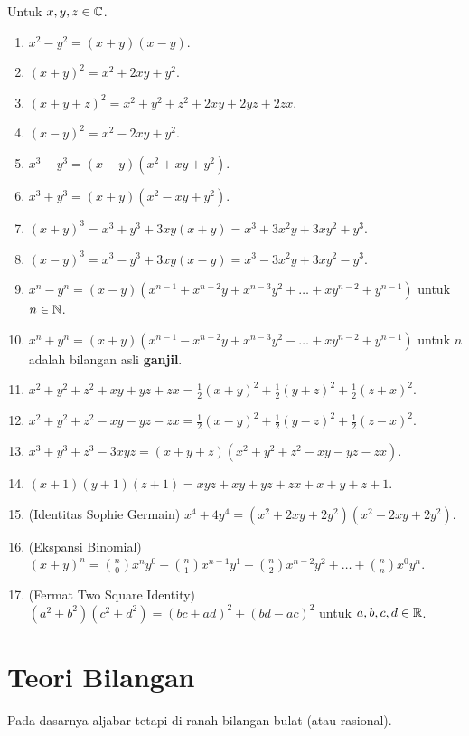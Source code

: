\documentclass[11pt]{scrartcl}
\begin{document}
	Untuk $x,y,z \in \mathbb C$.
	\begin{enumerate}
	    \item $x^2-y^2 = (x+y)(x-y)$.
	    \item $(x+y)^2 = x^2+2xy+y^2$.
	    \item $(x+y+z)^2 = x^2+y^2+z^2+2xy+2yz+2zx$.
	    \item $(x-y)^2 = x^2-2xy+y^2$.
	    \item $x^3-y^3 = (x-y)(x^2+xy+y^2)$.
	    \item $x^3+y^3 = (x+y)(x^2-xy+y^2)$.
	    \item $(x+y)^3 = x^3+y^3+3xy(x+y) = x^3+3x^2y+3xy^2+y^3$. 
	    \item $(x-y)^3 = x^3-y^3+3xy(x-y) = x^3-3x^2y+3xy^2-y^3$. 
	    \item $x^n-y^n = (x-y)(x^{n-1}+x^{n-2}y+x^{n-3}y^2+\dots+xy^{n-2}+y^{n-1})$ untuk $n \in \mathbb N$.
	    \item $x^n+y^n = (x+y)(x^{n-1}-x^{n-2}y+x^{n-3}y^2-\dots+xy^{n-2}+y^{n-1})$ untuk $n$ adalah bilangan asli \textbf{ganjil}.
	    \item $x^2+y^2+z^2+xy+yz+zx = \frac12(x+y)^2+\frac12(y+z)^2+\frac12(z+x)^2$.
	    \item $x^2+y^2+z^2-xy-yz-zx = \frac12(x-y)^2+\frac12(y-z)^2+\frac12(z-x)^2$.
	    \item $x^3+y^3+z^3-3xyz = (x+y+z)(x^2+y^2+z^2-xy-yz-zx)$.
	    \item $(x+1)(y+1)(z+1)=xyz+xy+yz+zx+x+y+z+1$.
	    \item (Identitas Sophie Germain) $x^4+4y^4=(x^2+2xy+2y^2)(x^2-2xy+2y^2)$.
	    \item (Ekspansi Binomial) $(x+y)^n = {n \choose 0}x^ny^0 + {n \choose 1}x^{n-1}y^1+{n \choose 2}x^{n-2}y^2 + \dots + {n \choose n}x^0y^n$.
	    \item (Fermat Two Square Identity) $(a^2+b^2)(c^2+d^2)=(bc+ad)^2+(bd-ac)^2$ untuk $a,b,c,d \in \mathbb R$.
	\end{enumerate}
	
	\section{Teori Bilangan}
	Pada dasarnya aljabar tetapi di ranah bilangan bulat (atau rasional).
\end{document}
